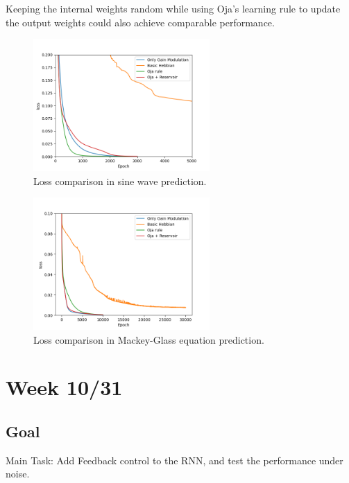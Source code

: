 \documentclass[12pt, a4paper]{article}
\begin{document}
Keeping the internal weights random while using Oja's learning rule to update the output weights could also achieve comparable performance.

\begin{figure}[H]
    \centering
    \includegraphics[width=0.6\textwidth]{fig/sin_loss_compare.png}
     \caption{Loss comparison in sine wave prediction.}
\end{figure}

\begin{figure}[H]
    \centering
    \includegraphics[width=0.6\textwidth]{fig/MG_loss_compare.png}
    \caption{Loss comparison in Mackey-Glass equation prediction.}
\end{figure}

\newpage


\section*{Week 10/31}

\subsection*{Goal}

\noindent
Main Task: Add Feedback control to the RNN, and test the performance under noise.
\end{document}

